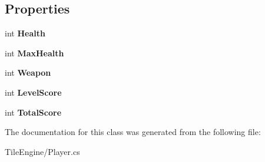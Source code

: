 \subsection*{Properties}
\begin{DoxyCompactItemize}
\item 
\hypertarget{class_tile_engine_1_1_player_a5859a9b5810a5078477ca3a2ea47826c}{int {\bfseries Health}}\label{de/dfa/class_tile_engine_1_1_player_a5859a9b5810a5078477ca3a2ea47826c}

\item 
\hypertarget{class_tile_engine_1_1_player_a1be81bcdf3e53278f55a6f643053ebc6}{int {\bfseries Max\-Health}}\label{de/dfa/class_tile_engine_1_1_player_a1be81bcdf3e53278f55a6f643053ebc6}

\item 
\hypertarget{class_tile_engine_1_1_player_a15aa89534fb0c5c4d0632235f9f56a65}{int {\bfseries Weapon}}\label{de/dfa/class_tile_engine_1_1_player_a15aa89534fb0c5c4d0632235f9f56a65}

\item 
\hypertarget{class_tile_engine_1_1_player_ab02f666ed3f5f6bfd3b05a719de41a31}{int {\bfseries Level\-Score}}\label{de/dfa/class_tile_engine_1_1_player_ab02f666ed3f5f6bfd3b05a719de41a31}

\item 
\hypertarget{class_tile_engine_1_1_player_a7382134b6b274ba1bd4992dbbad52a86}{int {\bfseries Total\-Score}}\label{de/dfa/class_tile_engine_1_1_player_a7382134b6b274ba1bd4992dbbad52a86}

\end{DoxyCompactItemize}


The documentation for this class was generated from the following file\-:\begin{DoxyCompactItemize}
\item 
Tile\-Engine/Player.\-cs\end{DoxyCompactItemize}

